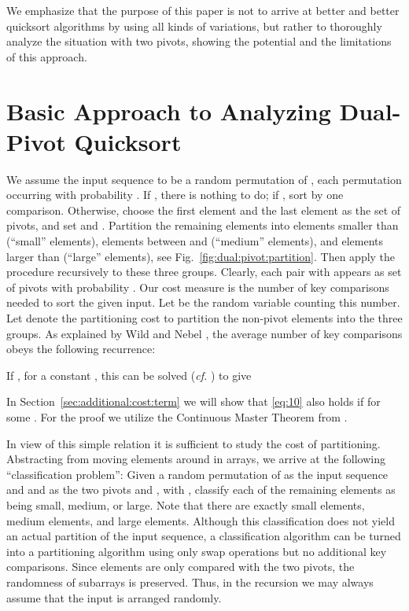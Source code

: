 \documentclass[prodmode,acmtalg]{acmsmall}
\begin{document}
We emphasize that the purpose of this paper is not to arrive at better and
better quicksort algorithms by using all kinds of variations, but rather to
thoroughly analyze the situation with two pivots, showing the potential and the
limitations of this approach.  

\section{Basic Approach to Analyzing Dual-Pivot
Quicksort}\label{sec:average:case:analysis}
We assume the input sequence  to be a random permutation of ,
each permutation occurring with probability . If , there is
nothing to do; if , sort by one comparison. Otherwise, choose the first element  and
the last element  as the set of pivots, and set 
and . Partition the remaining elements into elements smaller
than 
(``small'' elements), 
elements between  and  (``medium'' elements), and elements larger than 
(``large'' elements), see Fig.~\ref{fig:dual:pivot:partition}.
Then apply the procedure recursively to these three 
groups.
Clearly, each pair  with 
appears as set of pivots with probability .
Our cost measure is the number of key comparisons needed to
sort the given input. Let
 be the random variable counting this number. Let  denote the
partitioning cost to partition the  non-pivot elements into the three
groups. As
explained by Wild and Nebel \cite[Appendix A]{nebel12}, the average number of
key comparisons obeys the following recurrence: 

If , for a constant , this can
be solved (\emph{cf.} \cite{hennequin,nebel12}) to give

In Section~\ref{sec:additional:cost:term} we will show that \eqref{eq:10} also holds
if  for some . 
For the proof we utilize the Continuous Master Theorem from \cite{Roura01}.

In view of this simple relation it is sufficient to study the cost of partitioning.
Abstracting from moving elements around in arrays, we arrive at the following
``classification problem'':
Given a random permutation  of  as the input
sequence and  and  as the two pivots  and , with ,
classify each of the remaining  elements as being small, medium, or large.
Note that there are exactly
 small elements,  medium elements, and  large
elements. 
Although this
classification does not yield an actual partition of the input sequence, 
a classification algorithm can be turned into a partitioning algorithm using
only swap operations
but no additional key comparisons. Since elements are only
compared with the two pivots, the randomness of subarrays is preserved. Thus,
in the recursion we may always assume that the input is arranged randomly.
\end{document}
